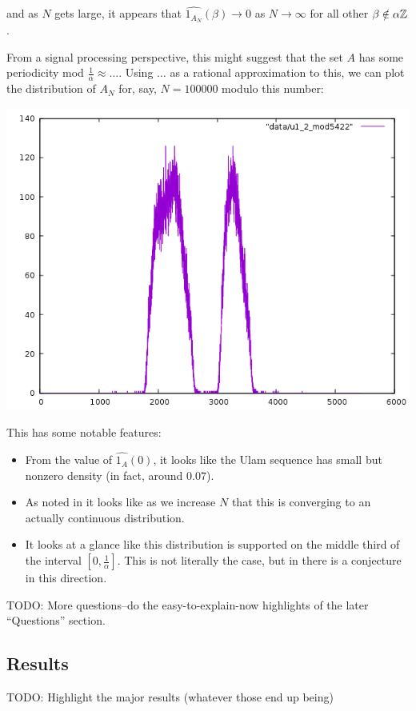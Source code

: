 \documentclass{article}
\theoremstyle{definition}
\theoremstyle{remark}
\numberwithin{equation}{section}
\begin{document}
and as $N$ gets large, it appears that
$\widehat{1_{A_N}}(\beta) \to 0$ as $N \to \infty$ for all other
$\beta \notin \alpha\mathbb{Z}$.

From a signal processing perspective, this might suggest that the set
$A$ has some periodicity mod $\frac 1 \alpha \approx \ldots$.  Using
$\ldots$ as a rational approximation to this, we can plot the
distribution of $A_N$ for, say, $N = 100000$ modulo this number: 

\includegraphics[scale=0.5]{../figs/u1_2_mod5422.png}

This has some notable features: 

\begin{itemize}
\item From the value of $\widehat{1_A}(0)$, it looks like the Ulam
  sequence has small but nonzero density (in fact, around $0.07$).

\item As noted in \cite{ulam_steinerberger} it looks like as we increase $N$
  that this is converging to an actually continuous distribution.

\item It looks at a glance like this distribution is supported on the
  middle third of the interval $[0,\frac1\alpha]$.  This is not
  literally the case, but in \cite{avoid_zero_gibbs} there is a
  conjecture in this direction.

\end{itemize}

{\color{red}

TODO: More questions--do the easy-to-explain-now highlights of the
later ``Questions'' section.

\subsection{Results}

TODO: Highlight the major results (whatever those end up being)

}
\end{document}
